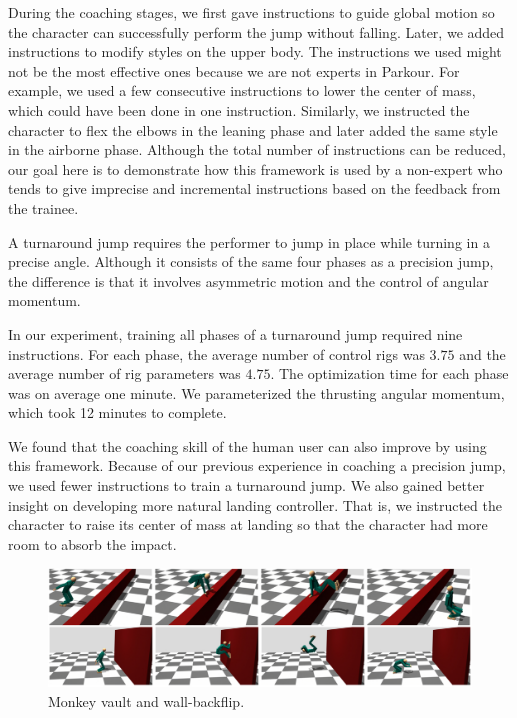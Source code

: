 During the coaching stages, we first gave instructions to guide global
motion so the character can successfully perform the jump
without falling. Later, we added instructions to modify styles on the
upper body. The instructions we used might not be the most effective
ones because we are not experts in Parkour. For example, we used a few
consecutive instructions to lower the center of mass, which could have
been done in one instruction. Similarly, we instructed the character
to flex the elbows in the leaning phase and later added the same style in
the airborne phase. Although the total number of instructions can be
reduced, our goal here is to demonstrate how this framework is used by
a non-expert who tends to give imprecise and incremental instructions
based on the feedback from the trainee.


A turnaround jump requires the performer to jump in place while
turning in a precise angle. Although it consists of the same four phases
as a precision jump, the difference is that it involves asymmetric
motion and the control of angular momentum.

In our experiment, training all phases of a turnaround jump required
nine instructions. For each phase, the average number of control rigs
was $3.75$ and the average number of rig parameters was $4.75$. The
optimization time for each phase was on average one minute. We
parameterized the thrusting angular momentum, which took 12 minutes to
complete.

We found that the coaching skill of the human user can also improve by
using this framework. Because of our previous experience in coaching a
precision jump, we used fewer instructions to train a turnaround
jump. We also gained better insight on developing more natural landing
controller. That is, we instructed the character to raise its center
of mass at landing so that the character had more room to absorb the
impact.

\begin{figure}[htbp]
\center
  \includegraphics[width=6.7in]{images/results}
  \caption{
    Monkey vault and wall-backflip.
  }
  \label{fig:parkour_results}
\end{figure}

